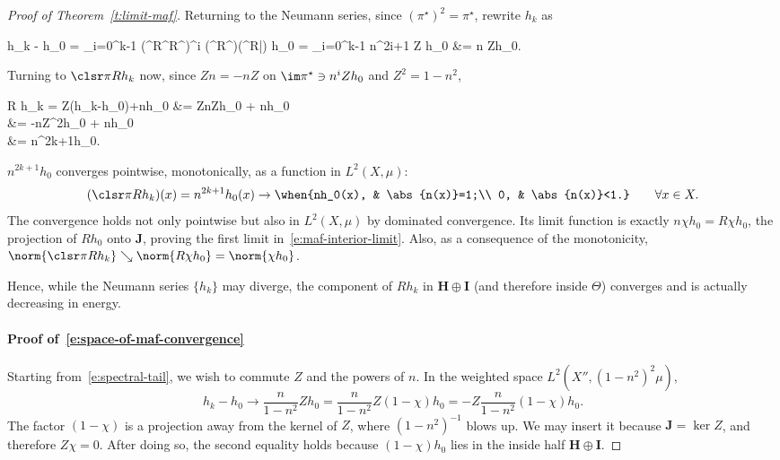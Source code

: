 \documentclass[10pt]{article}
\theoremstyle{plain}
\theoremstyle{definition}
\theoremstyle{remark}
\numberwithin{theorem}{section}
\numberwithin{example}{section}
\numberwithin{equation}{section}
\numberwithin{figure}{section}
\begin{document}
\begin{proof}[Proof of Theorem~\ref{t:limit-maf}]
%
%
Returning to the Neumann series, since $(\pi^\star)^2 = \pi^\star$, rewrite $h_k$ as
%
%
\begin{nalign}
	h_k - h_0	= \sum_{i=0}^{k-1} (\pi^\star R\pi^\star R\pi^\star )^i
						 (\pi^\star R\pi^\star)(\pi^\star R\bar\pi) h_0
		=  \sum_{i=0}^{k-1} n^{2i+1} Z h_0
		&=  n Zh_0.
	\label{e:spectral-tail}
\end{nalign}
%
%
Turning to $\clsr\pi R h_k$ now, since $Zn=-nZ$ on $\im\pi^\star\owns n^iZh_0$ and $Z^2=1-n^2$,
%
%
\begin{nalign}
	\clsr\pi R h_k
	=
	Z(h_k-h_0)+nh_0
	&=
	ZnZh_0 + nh_0\\
	&=
	-nZ^2h_0 + nh_0\\
	&=
	n^{2k+1}h_0.
\end{nalign}
%
%
$n^{2k+1}h_0$ converges pointwise, monotonically, as a function in $L^2(X,\mu)$:
%
%
\begin{equation}
	(\clsr\pi Rh_k)(x) = n^{2k+1}h_0(x) \to \when{nh_0(x), & \abs{n(x)}=1;\\
						0, & \abs{n(x)}<1.}
	\qquad
	\forall x\in X.
	\label{e:lim-pibar-Rhk}
\end{equation}
%
%
The convergence holds not only pointwise but also in $L^2(X,\mu)$ by dominated convergence. Its limit function is exactly $n\chi h_0=R\chi h_0$, the projection of $Rh_0$ onto $\mathbf J$, proving the first limit in~\eqref{e:maf-interior-limit}. Also, as a consequence of the monotonicity, $\norm{\clsr\pi Rh_k}\searrow \norm{R\chi h_0}=\norm{\chi h_0}$.

Hence, while the Neumann series $\{h_k\}$ may diverge, the component of $Rh_k$ in $\mathbf H\oplus\mathbf I$ (and therefore inside $\Theta$) converges and is actually decreasing in energy.


\paragraph{Proof of~\eqref{e:space-of-maf-convergence}}

Starting from~\eqref{e:spectral-tail}, we wish to commute $Z$ and the powers of $n$.
In the weighted space $L^2(X'',(1-n^2)^2\mu)$,
\begin{equation}
	h_k-h_0\to \frac{n}{1-n^2}Zh_0 = \frac{n}{1-n^2}Z(1-\chi) h_0 = -Z\frac{n}{1-n^2}(1-\chi) h_0.
\end{equation}
The factor $(1-\chi)$ is a projection away from the kernel of $Z$, where $(1-n^2)^{-1}$ blows up. We may insert it because $\mathbf J=\ker Z$, and therefore $Z\chi=0$. After doing so, the second equality holds because $(1-\chi)h_0$ lies in the inside half $\mathbf H\oplus\mathbf I$.


\end{proof}
\end{document}
